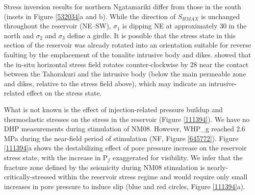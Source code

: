 Stress inversion results for northern Ngatamariki differ from those in the south (insets in Figure \ref{532034}a and b). While the direction of $S_{HMAX}$ is unchanged throughout the reservoir (NE--SW), $\sigma_1$ is dipping NE at approximately 30\textdegree{} in the north and $\sigma_2$ and $\sigma_3$ define a girdle. It is possible that the stress state in this section of the reservoir was already rotated into an orientation suitable for reverse faulting by the emplacement of the tonalite intrusive body and dikes. \citet{massiot_2012} showed that the in-situ horizontal stress field rotates counter-clockwise by 28\textdegree{} near the contact between the Tahorakuri and the intrusive body (below the main permeable zone and dikes, relative to the stress field above), which may indicate an intrusive-related effect on the stress state.

What is not known is the effect of injection-related pressure buildup and thermoelastic stresses on the stress in the reservoir (Figure \ref{111394}). We have no \acrshort{DHP} measurements during \gls{stimulation} of NM08. However, \gls{WHP_g} reached 2.6 MPa during the near-field period of \gls{stimulation} (NF, Figure \ref{645772}). Figure \ref{111394}a shows the destabilizing effect of pore pressure increase on the reservoir stress state, with the increase in P$_f$ exaggerated for visibility. We infer that the fracture zone defined by the seismicity during NM08 stimulation is nearly-critically-stressed within the reservoir stress regime and would require only small increases in pore pressure to induce slip (blue and red circles, Figure \ref{111394}a).

